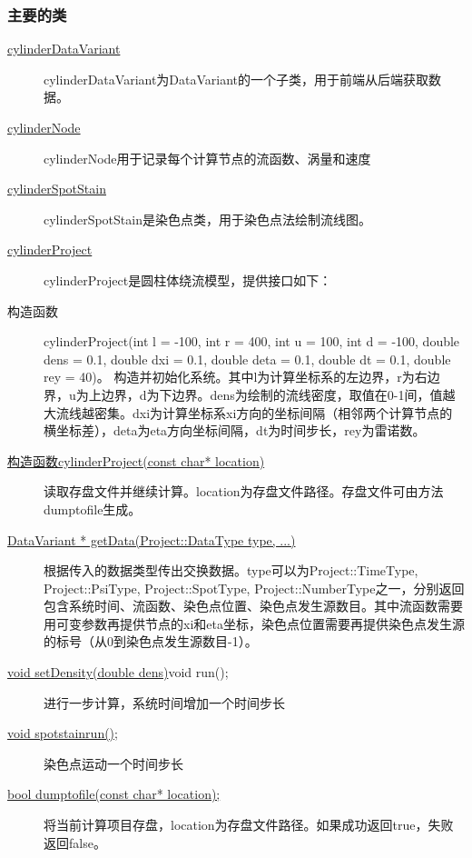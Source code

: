 \documentclass[12pt]{article}
\begin{document}
\subsubsection{主要的类}
\begin{description}
\item[\underline{cylinderDataVariant}]
cylinderDataVariant为DataVariant的一个子类，用于前端从后端获取数据。

\item[\underline{cylinderNode}]
cylinderNode用于记录每个计算节点的流函数、涡量和速度

\item[\underline{cylinderSpotStain}]
cylinderSpotStain是染色点类，用于染色点法绘制流线图。

\item[\underline{cylinderProject}]
cylinderProject是圆柱体绕流模型，提供接口如下：
\item[构造函数]cylinderProject(int l = -100, int r = 400, int u = 100, int d = -100, double dens = 0.1, double dxi = 0.1, double deta = 0.1, double dt = 0.1, double rey = 40)。
构造并初始化系统。其中l为计算坐标系的左边界，r为右边界，u为上边界，d为下边界。dens为绘制的流线密度，取值在0-1间，值越大流线越密集。dxi为计算坐标系xi方向的坐标间隔（相邻两个计算节点的横坐标差），deta为eta方向坐标间隔，dt为时间步长，rey为雷诺数。

\item[\underline{构造函数cylinderProject(const char* location)}]
读取存盘文件并继续计算。location为存盘文件路径。存盘文件可由方法dumptofile生成。

\item[\underline{DataVariant * getData(Project::DataType type, ...)}]
根据传入的数据类型传出交换数据。type可以为Project::TimeType, Project::PsiType, Project::SpotType, Project::NumberType之一，分别返回包含系统时间、流函数、染色点位置、染色点发生源数目。其中流函数需要用可变参数再提供节点的xi和eta坐标，染色点位置需要再提供染色点发生源的标号（从0到染色点发生源数目-1）。

\item[\underline{void setDensity(double dens)}void run();]
进行一步计算，系统时间增加一个时间步长

\item[\underline{void spotstainrun();}]
染色点运动一个时间步长

\item[\underline {bool dumptofile(const char* location);}]
将当前计算项目存盘，location为存盘文件路径。如果成功返回true，失败返回false。


\end{description}
\end{document}

